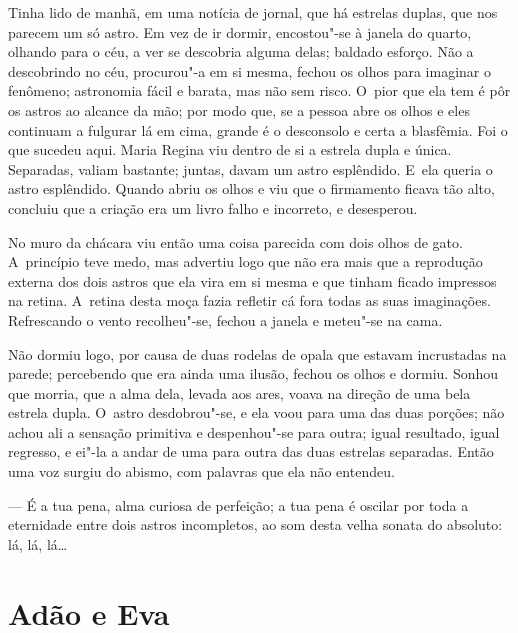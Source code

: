 \begin{linenumbers}
Tinha lido de manhã, em uma notícia de jornal, que há estrelas duplas,
que nos parecem um só astro. Em vez de ir dormir, encostou"-se à janela
do quarto, olhando para o céu, a ver se descobria alguma delas; baldado
esforço. Não a descobrindo no céu, procurou"-a em si mesma, fechou os
olhos para imaginar o fenômeno; astronomia fácil e barata, mas não sem
risco. O~pior que ela tem é pôr os astros ao alcance da mão; por modo
que, se a pessoa abre os olhos e eles continuam a fulgurar lá em cima,
grande é o desconsolo e certa a blasfêmia. Foi o que sucedeu aqui. Maria
Regina viu dentro de si a estrela dupla e única. Separadas, valiam
bastante; juntas, davam um astro esplêndido. E~ela queria o astro
esplêndido. Quando abriu os olhos e viu que o firmamento ficava tão
alto, concluiu que a criação era um livro falho e incorreto, e
desesperou.

No muro da chácara viu então uma coisa parecida com dois olhos de gato.
A~princípio teve medo, mas advertiu logo que não era mais que a
reprodução externa dos dois astros que ela vira em si mesma e que tinham
ficado impressos na retina. A~retina desta moça fazia refletir cá fora
todas as suas imaginações. Refrescando o vento recolheu"-se, fechou a
janela e meteu"-se na cama.

Não dormiu logo, por causa de duas rodelas de opala que estavam
incrustadas na parede; percebendo que era ainda uma ilusão, fechou os
olhos e dormiu. Sonhou que morria, que a alma dela, levada aos ares,
voava na direção de uma bela estrela dupla. O~astro desdobrou"-se, e ela
voou para uma das duas porções; não achou ali a sensação primitiva e
despenhou"-se para outra; igual resultado, igual regresso, e ei"-la a
andar de uma para outra das duas estrelas separadas. Então uma voz
surgiu do abismo, com palavras que ela não entendeu.

--- É a tua pena, alma curiosa de perfeição; a tua pena é oscilar por
toda a eternidade entre dois astros incompletos, ao som desta velha
sonata do absoluto: lá, lá, lá\ldots{}

\end{linenumbers}

\chapter{Adão e Eva}

